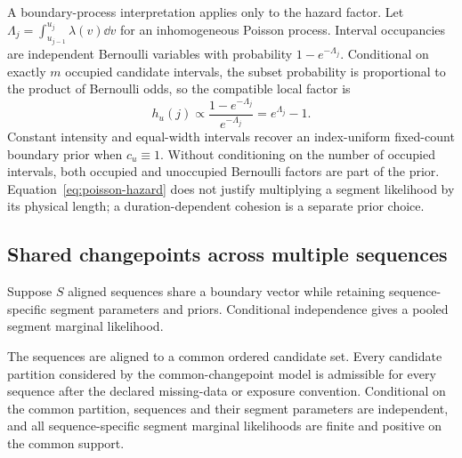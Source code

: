 A boundary-process interpretation applies only to the hazard factor. Let
$\Lambda_j=\int_{u_{j-1}}^{u_j}\lambda(v)\dd v$ for an inhomogeneous Poisson process. Interval
occupancies are independent Bernoulli variables with probability $1-e^{-\Lambda_j}$. Conditional
on exactly $m$ occupied candidate intervals, the subset probability is proportional to the product
of Bernoulli odds, so the compatible local factor is
\begin{equation}
 h_u(j)\propto \frac{1-e^{-\Lambda_j}}{e^{-\Lambda_j}}=e^{\Lambda_j}-1.
\label{eq:poisson-hazard}
\end{equation}
Constant intensity and equal-width intervals recover an index-uniform fixed-count boundary prior when $c_u\equiv1$. Without conditioning on the number of occupied intervals, both occupied and unoccupied Bernoulli factors are part of the prior. Equation~\eqref{eq:poisson-hazard} does not justify multiplying a segment likelihood by its physical length; a duration-dependent cohesion is a separate prior choice.



\subsection{Shared changepoints across multiple sequences}
Suppose $S$ aligned sequences share a boundary vector while retaining sequence-specific segment parameters and priors. Conditional independence gives a pooled segment marginal likelihood.



\begin{assumption}
\label{ass:shared-support}
The sequences are aligned to a common ordered candidate set. Every candidate partition considered by the common-changepoint model is admissible for every sequence after the declared missing-data or exposure convention. Conditional on the common partition, sequences and their segment parameters are independent, and all sequence-specific segment marginal likelihoods are finite and positive on the common support.
\end{assumption}

